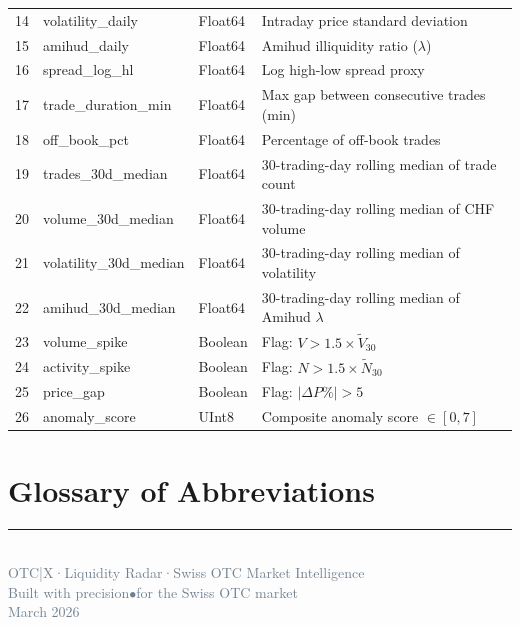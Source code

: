 \documentclass[
  11pt,
  a4paper,
  twoside,
  openany
]{report}
\begin{document}
\begin{longtable}{c >{\ttfamily}l l p{6.5cm}}
14 & volatility\_daily      & Float64  & Intraday price standard deviation \\
\rowcolor{LightSilver}
15 & amihud\_daily          & Float64  & Amihud illiquidity ratio ($\lambda$) \\
16 & spread\_log\_hl         & Float64  & Log high-low spread proxy \\
\rowcolor{LightSilver}
17 & trade\_duration\_min    & Float64  & Max gap between consecutive trades (min) \\
18 & off\_book\_pct          & Float64  & Percentage of off-book trades \\
\rowcolor{LightSilver}
19 & trades\_30d\_median     & Float64  & 30-trading-day rolling median of trade count \\
20 & volume\_30d\_median     & Float64  & 30-trading-day rolling median of CHF volume \\
\rowcolor{LightSilver}
21 & volatility\_30d\_median & Float64  & 30-trading-day rolling median of volatility \\
22 & amihud\_30d\_median     & Float64  & 30-trading-day rolling median of Amihud $\lambda$ \\
\rowcolor{LightSilver}
23 & volume\_spike          & Boolean  & Flag: $V > 1.5 \times \tilde{V}_{30}$ \\
24 & activity\_spike        & Boolean  & Flag: $N > 1.5 \times \tilde{N}_{30}$ \\
\rowcolor{LightSilver}
25 & price\_gap             & Boolean  & Flag: $|\Delta P\%| > 5$ \\
26 & anomaly\_score         & UInt8    & Composite anomaly score $\in [0, 7]$ \\
\end{longtable}


\chapter{Glossary of Abbreviations}
\label{app:glossary}

\printglossary[type=\acronymtype, title={}, nonumberlist]

\vfill

\begin{center}
\noindent\textcolor{SwissRed}{\rule{0.6\textwidth}{1pt}}\\[8pt]
{\small\textcolor{SlateGrey}{OTC\;|\;X\;\;·\;\;Liquidity Radar\;\;·\;\;Swiss OTC Market Intelligence}}\\[4pt]
{\footnotesize\textcolor{SlateGrey}{Built with precision\;\;$\bullet$\;\;for the Swiss OTC market}}\\[4pt]
{\footnotesize\textcolor{SlateGrey}{March 2026}}
\end{center}
\end{document}
